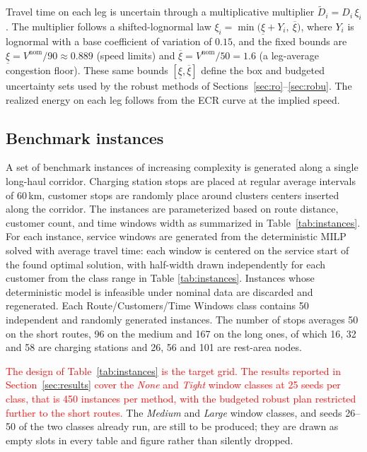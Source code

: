 \documentclass[preprint,12pt,3p]{elsarticle}
\newcommand{\red}[1]{\textcolor{red}{#1}}
\newcommand{\blue}[1]{{\color{darkblue}#1}}
\begin{document}
Travel time on each leg is uncertain through a multiplicative multiplier $\tilde D_i = D_i\,\xi_i$. The multiplier follows a shifted-lognormal law $\xi_i = \min\!\bigl(\underline\xi + Y_i,\ \overline\xi\bigr)$, where $Y_i$ is lognormal with a base coefficient of variation of $0.15$, and the fixed bounds are $\underline\xi = V^{\mathrm{nom}}/90 \approx 0.889$ (speed limits) and $\overline\xi = V^{\mathrm{nom}}/50 = 1.6$ (a leg-average congestion floor). These same bounds $[\underline\xi,\overline\xi]$ define the box and budgeted uncertainty sets used by the robust methods of Sections~\ref{sec:ro}--\ref{sec:robu}. The realized energy on each leg follows from the ECR curve at the implied speed.


\subsection{Benchmark instances}

A set of benchmark instances of increasing complexity is generated along a single long-haul corridor. Charging station stops are placed at regular average intervals of 60\,km, customer stops are randomly place around clusters centers inserted along the corridor. The instances are parameterized based on route distance, customer count, and time windows width as summarized in Table~\ref{tab:instances}. For each instance, service windows are generated from the deterministic MILP solved with average travel time: each window is centered on the service start of the found optimal solution, with half-width drawn independently for each customer from the class range in Table \ref{tab:instances}. Instances whose deterministic model is infeasible under nominal data are discarded and regenerated. Each Route/Customers/Time Windows class contains 50 independent and randomly generated instances. The number of stops averages 50 on the short routes, 96 on the medium and 167 on the long ones, of which 16, 32 and 58 are charging stations and 26, 56 and 101 are rest-area nodes.

\red{The design of Table~\ref{tab:instances} is the target grid. The results
reported in Section~\ref{sec:results} cover the \emph{None} and \emph{Tight}
window classes at 25 seeds per class, that is 450 instances per method, with the
budgeted robust plan restricted further to the short routes.}
\blue{The \emph{Medium} and \emph{Large} window classes, and seeds 26--50 of the
two classes already run, are still to be produced; they are drawn as empty slots
in every table and figure rather than silently dropped.}
\end{document}
